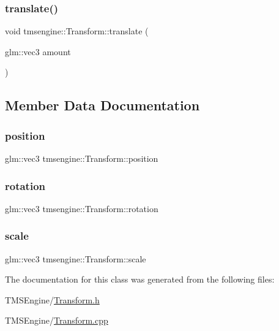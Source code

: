 \subsubsection{\texorpdfstring{translate()}{translate()}}
{\footnotesize\ttfamily void tmsengine\+::\+Transform\+::translate (\begin{DoxyParamCaption}\item[{glm\+::vec3}]{amount }\end{DoxyParamCaption})}



\subsection{Member Data Documentation}
\mbox{\label{classtmsengine_1_1_transform_a588c0d056219dbe15a97c727a36880aa}} 
\subsubsection{\texorpdfstring{position}{position}}
{\footnotesize\ttfamily glm\+::vec3 tmsengine\+::\+Transform\+::position\hspace{0.3cm}{\ttfamily [private]}}

\mbox{\label{classtmsengine_1_1_transform_a3dfc7b3c7d5cebed1168fd124a81803c}} 
\subsubsection{\texorpdfstring{rotation}{rotation}}
{\footnotesize\ttfamily glm\+::vec3 tmsengine\+::\+Transform\+::rotation\hspace{0.3cm}{\ttfamily [private]}}

\mbox{\label{classtmsengine_1_1_transform_a7a166d9bb060a56975ffb75dba91ee58}} 
\subsubsection{\texorpdfstring{scale}{scale}}
{\footnotesize\ttfamily glm\+::vec3 tmsengine\+::\+Transform\+::scale\hspace{0.3cm}{\ttfamily [private]}}



The documentation for this class was generated from the following files\+:\begin{DoxyCompactItemize}
\item 
T\+M\+S\+Engine/\hyperlink{_transform_8h}{Transform.\+h}\item 
T\+M\+S\+Engine/\hyperlink{_transform_8cpp}{Transform.\+cpp}\end{DoxyCompactItemize}

